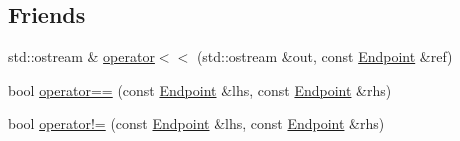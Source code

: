 \subsection*{Friends}
\begin{DoxyCompactItemize}
\item 
std\-::ostream \& \hyperlink{class_wy_light_1_1_endpoint_af3f74b3b812453bb6cc60400dfc0c82c}{operator$<$$<$} (std\-::ostream \&out, const \hyperlink{class_wy_light_1_1_endpoint}{Endpoint} \&ref)
\item 
bool \hyperlink{class_wy_light_1_1_endpoint_a156b06fbd5f39ef344d12405b3dd1dd3}{operator==} (const \hyperlink{class_wy_light_1_1_endpoint}{Endpoint} \&lhs, const \hyperlink{class_wy_light_1_1_endpoint}{Endpoint} \&rhs)
\item 
bool \hyperlink{class_wy_light_1_1_endpoint_a5ae8d57dccffa8396ec6e4a7177a784c}{operator!=} (const \hyperlink{class_wy_light_1_1_endpoint}{Endpoint} \&lhs, const \hyperlink{class_wy_light_1_1_endpoint}{Endpoint} \&rhs)
\end{DoxyCompactItemize}


